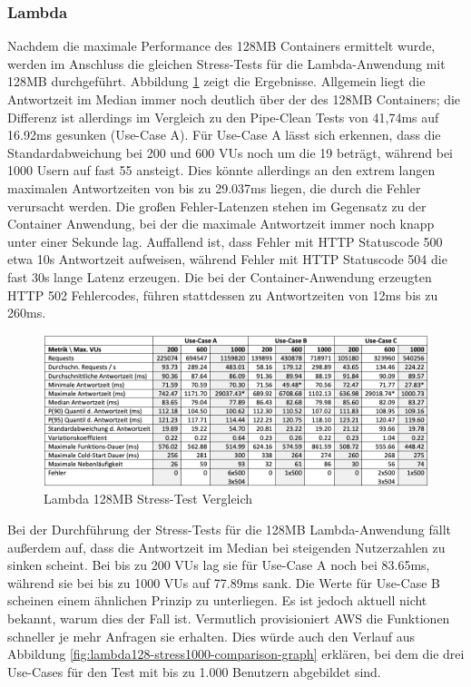 \subsubsection{Lambda}
Nachdem die maximale Performance des 128MB Containers ermittelt wurde, werden im Anschluss die gleichen Stress-Tests für die Lambda-Anwendung mit 128MB durchgeführt. Abbildung \ref{fig:lambda128-stress-comparison} zeigt die Ergebnisse. 
Allgemein liegt die Antwortzeit im Median immer noch deutlich über der des 128MB Containers; die Differenz ist allerdings im Vergleich zu den Pipe-Clean Tests von 41,74ms auf 16.92ms gesunken (Use-Case A).
Für Use-Case A lässt sich erkennen, dass die Standardabweichung bei 200 und 600 VUs noch um die 19 beträgt, während bei 1000 Usern auf fast 55 ansteigt. Dies könnte allerdings an den extrem langen maximalen Antwortzeiten von bis zu 29.037ms liegen, die durch die Fehler verursacht werden. Die großen Fehler-Latenzen stehen im Gegensatz zu der Container Anwendung, bei der die maximale Antwortzeit immer noch knapp unter einer Sekunde lag. Auffallend ist, dass Fehler mit HTTP Statuscode 500 etwa 10s Antwortzeit aufweisen, während Fehler mit HTTP Statuscode 504 die fast 30s lange Latenz erzeugen. Die bei der Container-Anwendung erzeugten HTTP 502 Fehlercodes, führen stattdessen zu  Antwortzeiten von 12ms bis zu 260ms. 

\begin{figure}[H]
    \includegraphics[width=\textwidth]{img/lambda128-stress-comparison.png}
    \caption[Lambda 128MB Stress-Test Vergleich]{Lambda 128MB Stress-Test Vergleich}
    \label{fig:lambda128-stress-comparison}
\end{figure}

Bei der Durchführung der Stress-Tests für die 128MB Lambda-Anwendung fällt außerdem auf, dass die Antwortzeit im Median bei steigenden Nutzerzahlen zu sinken scheint. Bei bis zu 200 VUs lag sie für Use-Case A noch bei 83.65ms, während sie bei bis zu 1000 VUs auf 77.89ms sank. Die Werte für Use-Case B scheinen einem ähnlichen Prinzip zu unterliegen. Es ist jedoch aktuell nicht bekannt, warum dies der Fall ist. Vermutlich provisioniert AWS die Funktionen schneller je mehr Anfragen sie erhalten.
Dies würde auch den Verlauf aus Abbildung \ref{fig:lambda128-stress1000-comparison-graph} erklären, bei dem die drei Use-Cases für den Test mit bis zu 1.000 Benutzern abgebildet sind.

